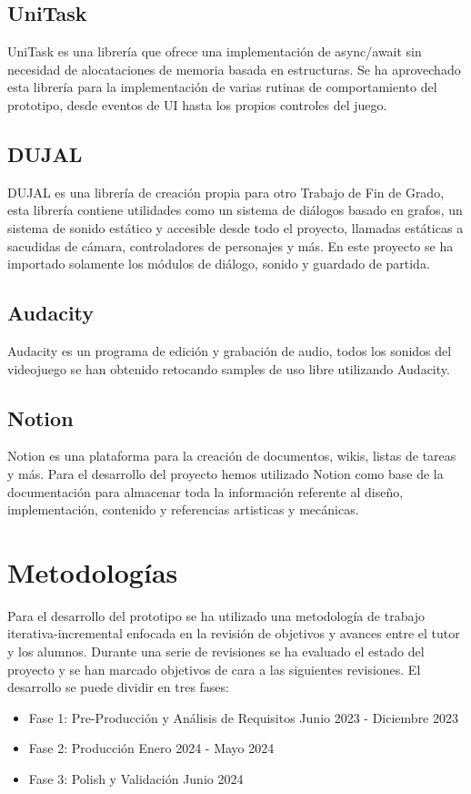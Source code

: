 \subsection{UniTask}

UniTask\cite{UniTask} es una librería que ofrece una implementación de async/await sin necesidad de alocataciones de memoria basada en estructuras. Se ha aprovechado esta librería para la implementación de varias rutinas de comportamiento del prototipo, desde eventos de UI hasta los propios controles del juego.

\subsection{DUJAL}

DUJAL\cite{DUJAL} es una librería de creación propia para otro Trabajo de Fin de Grado, esta librería contiene utilidades como un sistema de diálogos basado en grafos, un sistema de sonido estático y accesible desde todo el proyecto, llamadas estáticas a sacudidas de cámara, controladores de personajes y más. En este proyecto se ha importado solamente los módulos de diálogo, sonido y guardado de partida.

\subsection{Audacity}

Audacity\cite{Audacity} es un programa de edición y grabación de audio, todos los sonidos del videojuego se han obtenido retocando samples de uso libre utilizando Audacity.  

\subsection{Notion}

Notion \cite{notion} es una plataforma para la creación de documentos, wikis, listas de tareas y más. Para el desarrollo del proyecto hemos utilizado Notion como base de la documentación para almacenar toda la información referente al diseño, implementación, contenido y referencias artisticas y mecánicas.

\section{Metodologías}

Para el desarrollo del prototipo se ha utilizado una metodología de trabajo iterativa-incremental enfocada en la revisión de objetivos y
avances entre el tutor y los alumnos. Durante una serie de revisiones se ha evaluado el estado del proyecto y se han marcado objetivos de cara a las siguientes revisiones. El desarrollo se puede dividir en tres fases: 
\begin{itemize}
	\item Fase 1: Pre-Producción y Análisis de Requisitos Junio 2023 - Diciembre 2023
	\item Fase 2: Producción Enero 2024 - Mayo 2024
	\item Fase 3: Polish y Validación Junio 2024 
\end{itemize}

